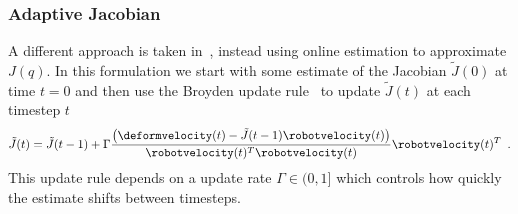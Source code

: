 \subsubsection{Adaptive Jacobian}

A different approach is taken in~\cite{Navarro-Alarcon2013}, instead using online estimation to approximate $J(q)$.
In this formulation we start with some estimate of the Jacobian $\tilde J(0)$ at time $t = 0$ and then use the Broyden update rule~\cite{Broyden1965} to update $\tilde J(t)$ at each timestep $t$
\begin{equation}
    \tilde J(t) = \tilde J(t-1) + \Gamma \frac{\left( \deformvelocity(t) - \tilde J(t-1) \robotvelocity(t) \right)}{\robotvelocity(t)^T \robotvelocity(t)} \robotvelocity(t)^T \enspace.
\end{equation}
This update rule depends on a update rate $\Gamma \in (0, 1]$ which controls how quickly the estimate shifts between timesteps.